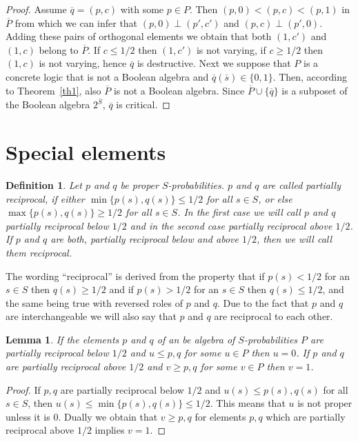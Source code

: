 \documentclass[12pt]{article}
\newtheorem{definition}[theorem]{Definition}
\newtheorem{lemma}[theorem]{Lemma}
\begin{document}
\begin{proof}
Assume $\overline q=(p,c)$ with some $p\in P$. Then $(p,0)<(p,c)<(p,1)$ in $\overline P$ from which we can infer that $(p,0)\perp(p',c')$ and $(p,c)\perp(p',0)$. Adding these pairs of orthogonal elements we obtain that both $(1,c')$ and $(1,c)$ belong to $\overline P$. If $c\le1/2$ then $(1,c')$ is not varying, if $c\ge1/2$ then $(1,c)$ is not varying, hence $\overline q$ is destructive. Next we suppose that $P$ is a concrete logic that is not a Boolean algebra and $\overline q(\overline s)\in\{0,1\}$. Then, according to Theorem~\ref{th1}, also $\overline P$ is not a Boolean algebra. Since $\overline P\cup\{\overline q\}$ is a subposet of the Boolean algebra $2^{\overline S}$, $\overline q$ is critical.
\end{proof} 

\section{Special elements}

\begin{definition}\label{def3}
Let $p$ and $q$ be proper $S$-probabilities. $p$ and $q$ are called {\em partially reciprocal}, if either $\min\{p(s),q(s)\}\le1/2$ for all $s\in S$, or else $\max\{p(s),q(s)\}\ge1/2$ for all $s\in S$. In the first case we will call $p$ and $q$ {\em partially reciprocal below $1/2$} and in the second case {\em partially reciprocal above $1/2$}. If $p$ and $q$ are both, partially reciprocal below and above $1/2$, then we will call them {\em reciprocal}.
\end{definition}

The wording ``reciprocal'' is derived from the property that if $p(s)<1/2$ for an $s\in S$ then $q(s)\geq1/2$ and if $p(s)>1/2$ for an $s\in S$ then $q(s)\leq 1/2$, and the same being true with reversed roles of $p$ and $q$. Due to the fact that $p$ and $q$ are interchangeable we will also say that $p$ and $q$ are reciprocal to each other. 

\begin{lemma}\label{lm1}
If the elements $p$ and $q$ of an be algebra of $S$-probabilities $P$ are partially reciprocal below $1/2$ and $u\le p,q$ for some $u\in P$ then $u=0$. If $p$ and $q$ are partially reciprocal above $1/2$ and $v\ge p,q$ for some $v\in P$ then $v=1$.
\end{lemma}

\begin{proof}
If $p,q$ are partially reciprocal below $1/2$ and $u(s)\le p(s),q(s)$ for all $s\in S$, then $u(s)\le\min\{p(s),q(s)\}\le1/2$. This means that $u$ is not proper unless it is $0$. Dually we obtain that $v\ge p,q$ for elements $p,q$ which are partially reciprocal above $1/2$ implies $v=1$.
\end{proof}
\end{document}
